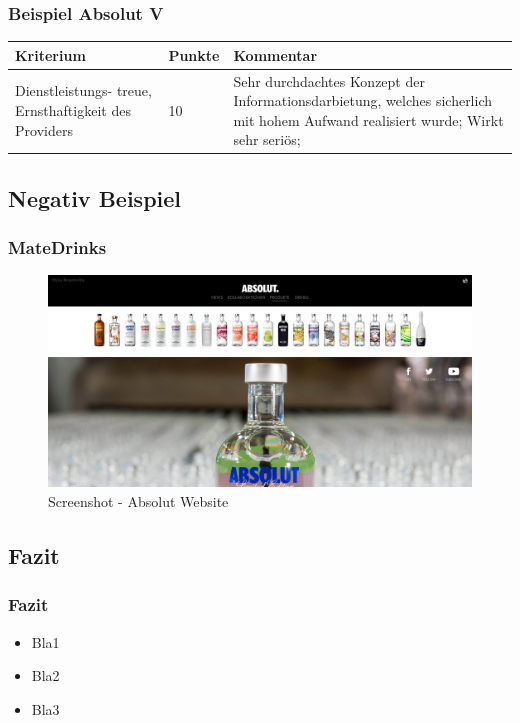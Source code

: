 \begin{frame}\frametitle{Beispiel Absolut V}
	\begin{tabular}{|p{}|l|p{6cm}|}
	\hline
	  Kriterium & Punkte & Kommentar \\ \hline
	  Dienstleistungs- treue, Ernsthaftigkeit des Providers & 10 & Sehr durchdachtes Konzept der Informationsdarbietung, welches sicherlich mit hohem Aufwand realisiert wurde; Wirkt sehr seriös; \\ \hline
 	\end{tabular}
\end{frame}

\subsection{Negativ Beispiel}
\begin{frame}
	\frametitle{MateDrinks}
	\begin{figure}
	\includegraphics[scale=0.2]{bilder/absolut.png}
	\caption[Screenshot - Absolut Vodka]{Screenshot - Absolut Website}
	\label{labelname}
	\end{figure}
\end{frame}

\subsection{Fazit}
\begin{frame}
	\frametitle{Fazit}
	\begin{itemize}
		\item Bla1
		\item Bla2
		\item Bla3
	\end{itemize}
\end{frame}


